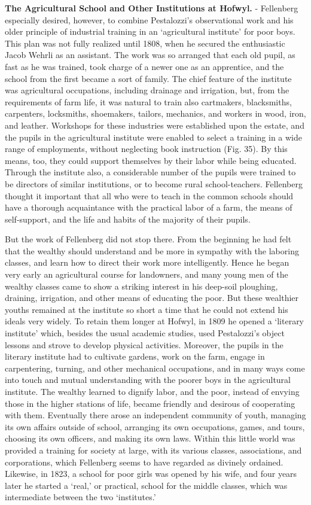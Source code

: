 \documentclass[]{book}
\begin{document}
\textbf{The Agricultural School and Other Institutions at Hofwyl.} - Fellenberg especially desired, however, to combine Pestalozzi's observational work and his older principle of industrial training in an `agricultural institute' for poor boys. This plan was not fully realized until 1808, when he secured the enthusiastic Jacob Wehrli as an assistant. The work was so arranged that each old pupil, as fast as he was trained, took charge of a newer one as an apprentice, and the school from the first became a sort of family. The chief feature of the institute was agricultural occupations, including drainage and irrigation, but, from the requirements of farm life, it was natural to train also cartmakers, blacksmiths, carpenters, locksmiths, shoemakers, tailors, mechanics, and workers in wood, iron, and leather. Workshops for these industries were established upon the estate, and the pupils in the agricultural institute were enabled to select a training in a wide range of employments, without neglecting book instruction (Fig. 35). By this means, too, they could support themselves by their labor while being educated. Through the institute also, a considerable number of the pupils were trained to be directors of similar institutions, or to become rural school-teachers. Fellenberg thought it important that all who were to teach in the common schools should have a thorough acquaintance with the practical labor of a farm, the means of self-support, and the life and habits of the majority of their pupils.

But the work of Fellenberg did not stop there. From the beginning he had felt that the wealthy should understand and be more in sympathy with the laboring classes, and learn how to direct their work more intelligently. Hence he began very early an agricultural course for landowners, and many young men of the wealthy classes came to show a striking interest in his deep-soil ploughing, draining, irrigation, and other means of educating the poor. But these wealthier youths remained at the institute so short a time that he could not extend his ideals very widely. To retain them longer at Hofwyl, in 1809 he opened a `literary institute' which, besides the usual academic studies, used Pestalozzi's object lessons and strove to develop physical activities. Moreover, the pupils in the literary institute had to cultivate gardens, work on the farm, engage in carpentering, turning, and other mechanical occupations, and in many ways come into touch and mutual understanding with the poorer boys in the agricultural institute. The wealthy learned to dignify labor, and the poor, instead of envying those in the higher stations of life, became friendly and desirous of cooperating with them. Eventually there arose an independent community of youth, managing its own affairs outside of school, arranging its own occupations, games, and tours, choosing its own officers, and making its own laws. Within this little world was provided a training for society at large, with its various classes, associations, and corporations, which Fellenberg seems to have regarded as divinely ordained. Likewise, in 1823, a school for poor girls was opened by his wife, and four years later he started a `real,' or practical, school for the middle classes, which was intermediate between the two `institutes.'
\end{document}
